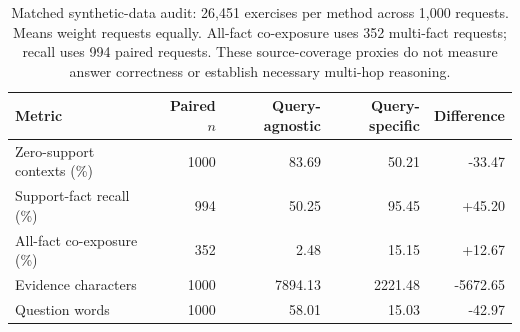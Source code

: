 \begin{table}[t]
\centering
\small
\caption{Matched synthetic-data audit: 26,451 exercises per method across 1,000 requests. Means weight requests equally. All-fact co-exposure uses 352 multi-fact requests; recall uses 994 paired requests. These source-coverage proxies do not measure answer correctness or establish necessary multi-hop reasoning.}
\label{tab:synthetic}
\begin{tabular}{lrrrr}
\toprule
Metric & Paired $n$ & Query-agnostic & Query-specific & Difference \\
\midrule
Zero-support contexts (\%) & 1000 & 83.69 & 50.21 & -33.47 \\
Support-fact recall (\%) & 994 & 50.25 & 95.45 & +45.20 \\
All-fact co-exposure (\%) & 352 & 2.48 & 15.15 & +12.67 \\
Evidence characters & 1000 & 7894.13 & 2221.48 & -5672.65 \\
Question words & 1000 & 58.01 & 15.03 & -42.97 \\
\bottomrule
\end{tabular}
\end{table}
